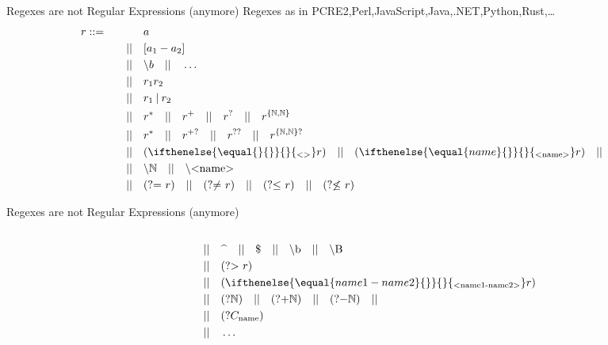\documentclass[aspectratio=169]{beamer}
\newcommand{\escaped}[1]{\backslash{}#1}
\newcommand{\disj}[0]{\mathbin{|}}
\renewcommand{\star}[0]{^{*}}
\newcommand{\plus}[0]{^{+}}
\newcommand{\question}[0]{^{?}}
\newcommand{\rrep}[2]{^{\{#1,#2\}}}
\newcommand{\lplus}[0]{^{+?}}
\newcommand{\lquestion}[0]{^{??}}
\newcommand{\lrrep}[2]{^{\{#1,#2\}?}}
\newcommand{\group}[2][]{(\ifthenelse{\equal{#1}{}}{}{_{\textup{\scriptsize<#1>}}}#2)}
\newcommand{\mstart}[0]{\widehat{\phantom{x}}}
\newcommand{\mend}[0]{\mathdollar}
\newcommand{\wboundary}[0]{\escaped{\textup{b}}}
\newcommand{\wBoundary}[0]{\escaped{\textup{B}}}
\newcommand{\lookahead}[1]{({?}{=}\ #1)}
\newcommand{\lookbehind}[1]{({?}{\leq}\ #1)}
\newcommand{\neglookahead}[1]{({?}{\not=}\ #1)}
\newcommand{\neglookbehind}[1]{({?}{\not\leq}\ #1)}
\newcommand{\nbackref}[1]{\escaped{\textup{<#1>}}}
\newcommand{\agroup}[1]{({?}{>}\ #1)}
\newcommand{\balgroup}[3]{\group[#1-#2]{#3}}
\newcommand{\recursion}[1]{({?}#1)} %
\newcommand{\callout}[1]{({?}C_{\textup{#1}})}
\newcommand{\rulesep}[0]{\quad{}||\quad{}}
\begin{document}
    \begin{frame}{Regexes are not Regular Expressions (anymore)}
        Regexes as in PCRE2,Perl,JavaScript,Java,.NET,Python,Rust,\ldots{}
        \pause{}
        \begin{align*}
            r \mathrel{::=}
            && & a \\
            &&\rulesep{}& [a_1-a_2] \\
            &&\rulesep{}& \escaped{b} \rulesep{} \ldots \\
            &&\rulesep{}& r_1 r_2 \\
            &&\rulesep{}& r_1 \disj{} r_2 \\
            &&\rulesep{}& r\star \rulesep{} r\plus{} \rulesep{} r\question{} \rulesep{} r\rrep{\mathbb{N}}{\mathbb{N}} \\
            &&\rulesep{}& r\star \rulesep{} r\lplus{} \rulesep{} r\lquestion{} \rulesep{} r\lrrep{\mathbb{N}}{\mathbb{N}} \\
            &&\rulesep{}& \group{r} \rulesep{} \group[name]{r} \rulesep{} \\
            &&\rulesep{}& \escaped{\mathbb{N}} \rulesep{} \nbackref{name} \\
            &&\rulesep{}& \lookahead{r} \rulesep{} \neglookahead{r} \rulesep{} \lookbehind{r} \rulesep{} \neglookbehind{r} %
        \end{align*}
    \end{frame}
    \begin{frame}{Regexes are not Regular Expressions (anymore)}
        \begin{align*}
            \phantom{r \mathrel{::=}} && & \phantom{\lookahead{r} \rulesep{} \neglookahead{r} \rulesep{} \lookbehind{r} \rulesep{} \neglookbehind{r}} \\
            &&\rulesep{}& \mstart{} \rulesep{} \mend{} \rulesep{} \wboundary{} \rulesep{} \wBoundary \\
            &&\rulesep{}& \agroup{r} \\
            &&\rulesep{}& \balgroup{name1}{name2}{r} \\
            &&\rulesep{}& \recursion{\mathbb{N}} \rulesep{} \recursion{{+}\mathbb{N}} \rulesep{} \recursion{{-}\mathbb{N}} \rulesep{} \\
            &&\rulesep{}& \callout{name} \\
            &&\rulesep{}& \ldots{}
        \end{align*}
    \end{frame}
\end{document}

